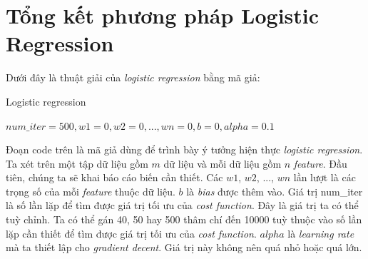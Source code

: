 \section{Tổng kết phương pháp Logistic Regression}
Dưới đây là thuật giải của \textit{logistic regression} bằng mã giả:
\clearpage
\begin{algorithm}[!h]
\caption{Logistic regression}
$num\_iter=500, w1 = 0, w2 = 0, ..., wn = 0, b = 0, alpha = 0.1$\\
\end{algorithm}

Đoạn code trên là mã giả dùng để trình bày ý tưởng hiện thực \textit{logistic regression}. Ta xét trên một tập dữ liệu gồm $m$ dữ liệu và mỗi dữ liệu gồm $n$ \textit{feature}. Đầu tiên, chúng ta sẽ khai báo cáo biến cần thiết. Các $w1$, $w2$, ..., $wn$ lần lượt là các trọng số của mỗi \textit{feature} thuộc dữ liệu. $b$ là \textit{bias} được thêm vào. Giá trị num\_iter là số lần lặp để tìm được giá trị tối ưu của \textit{cost function}. Đây là giá trị ta có thể tuỳ chỉnh. Ta có thể gán 40, 50 hay 500 thâm chí đến 10000 tuỳ thuộc vào số lần lặp cần thiết để tìm được giá trị tối ưu của \textit{cost function}. $alpha$ là \textit{learning rate} mà ta thiết lập cho \textit{gradient decent}. Giá trị này không nên quá nhỏ hoặc quá lớn.


